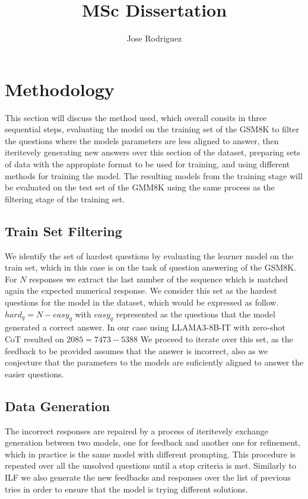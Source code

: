 \documentclass[a4paper,10pt]{article}
\title{MSc Dissertation}
\author{Jose Rodriguez}
\begin{document}
\maketitle

\begin{abstract}

\end{abstract}

\section{Methodology}

This section will discuss the method used, which overall consits in three sequential steps, evaluating the model on the training set of the GSM8K to filter the questions where the models parameters are less aligned to answer, then iteritevely generating new answers over this section of the dataset, preparing sets of data with the appropiate format to be used for training, and using different methods for training the model. The resulting models from the training stage will be evaluated on the test set of the GMM8K using the same process as the filtering stage of the training set.



\subsection{Train Set Filtering}
We identify the set of hardest questions by evaluating the learner model on the train set, which in this case is on the task of question answering of the GSM8K. For $N$ responses we extract the last number of the sequence which is matched again the expected numerical response. We consider this set as the hardest questions for the model in the dataset, which would be expressed as follow. $ hard_q =  N - easy_q $ with $easy_q$ represented as the questions that the model generated a correct answer.
In our case using LLAMA3-8B-IT with zero-shot CoT resulted on $ 2085 = 7473 - 5388 $ We proceed to iterate over this set, as the feedback to be provided assumes that the answer is incorrect, also as we conjecture that the parameters to the models are suficiently aligned to answer the easier questions.
\subsection{Data Generation}
The incorrect responses are repaired by a process of iteritevely exchange generation between two models, one for feedback and another one for refinement, which in practice is the same model with different prompting. This procedure is repeated over all the unsolved questions until a stop criteria is met. Similarly to ILF we also generate the new feedbacks and responses over the list of previous tries in order to ensure that the model is trying different solutions.
\end{document}
